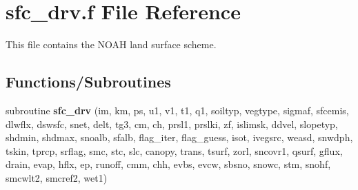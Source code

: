 \hypertarget{sfc__drv_8f}{}\section{sfc\+\_\+drv.\+f File Reference}
\label{sfc__drv_8f}


This file contains the N\+O\+AH land surface scheme.  


\subsection*{Functions/\+Subroutines}
\begin{DoxyCompactItemize}
\item 
subroutine {\bfseries sfc\+\_\+drv} (im, km, ps, u1, v1, t1, q1, soiltyp, vegtype, sigmaf, sfcemis, dlwflx, dswsfc, snet, delt, tg3, cm, ch, prsl1, prslki, zf, islimsk, ddvel, slopetyp, shdmin, shdmax, snoalb, sfalb, flag\+\_\+iter, flag\+\_\+guess, isot, ivegsrc, weasd, snwdph, tskin, tprcp, srflag, smc, stc, slc, canopy, trans, tsurf, zorl, sncovr1, qsurf, gflux, drain, evap, hflx, ep, runoff, cmm, chh, evbs, evcw, sbsno, snowc, stm, snohf, smcwlt2, smcref2, wet1)
\end{DoxyCompactItemize}
